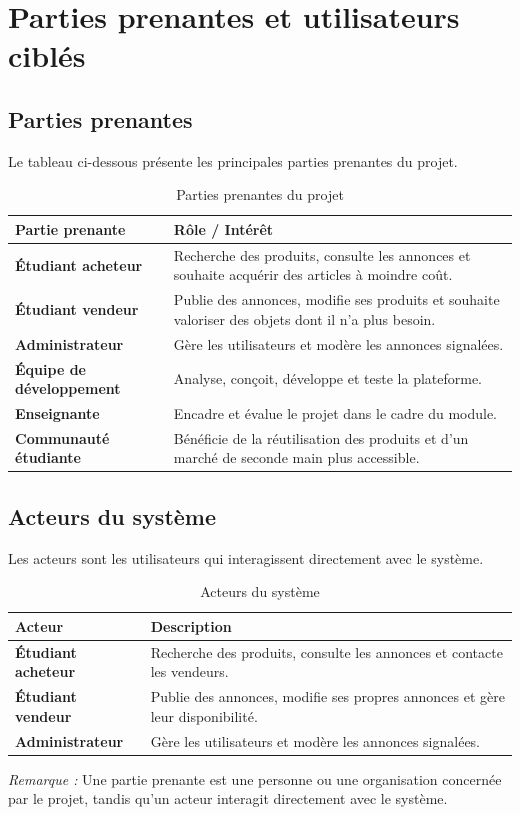 ﻿\chapter{Parties prenantes et utilisateurs ciblés}

\section{Parties prenantes}

Le tableau ci-dessous présente les principales parties prenantes du projet.

\begin{table}[h]
\centering
\begin{tabularx}{\textwidth}{>{\bfseries}l X}
\toprule
\textbf{Partie prenante} & \textbf{Rôle / Intérêt} \\
\midrule
Étudiant acheteur & Recherche des produits, consulte les annonces et souhaite acquérir des articles à moindre coût. \\
Étudiant vendeur & Publie des annonces, modifie ses produits et souhaite valoriser des objets dont il n'a plus besoin. \\
Administrateur & Gère les utilisateurs et modère les annonces signalées. \\
Équipe de développement & Analyse, conçoit, développe et teste la plateforme. \\
Enseignante & Encadre et évalue le projet dans le cadre du module. \\
Communauté étudiante & Bénéficie de la réutilisation des produits et d'un marché de seconde main plus accessible. \\
\bottomrule
\end{tabularx}
\caption{Parties prenantes du projet}
\end{table}

\section{Acteurs du système}

Les acteurs sont les utilisateurs qui interagissent directement avec le système.

\begin{table}[h]
\centering
\begin{tabularx}{\textwidth}{>{\bfseries}l X}
\toprule
\textbf{Acteur} & \textbf{Description} \\
\midrule
Étudiant acheteur & Recherche des produits, consulte les annonces et contacte les vendeurs. \\
Étudiant vendeur & Publie des annonces, modifie ses propres annonces et gère leur disponibilité. \\
Administrateur & Gère les utilisateurs et modère les annonces signalées. \\
\bottomrule
\end{tabularx}
\caption{Acteurs du système}
\end{table}

\textit{Remarque :} Une partie prenante est une personne ou une organisation concernée par le projet, tandis qu'un acteur interagit directement avec le système.
